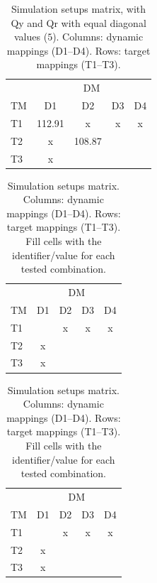 \documentclass[preprint,12pt,authoryear]{elsarticle}
\begin{document}
\begin{table}[h]
  \centering
  \caption{Simulation setups matrix, with Qy and Qr with equal diagonal values (\(5\)). Columns: dynamic mappings (D1--D4). Rows: target mappings (T1--T3).}
  \label{tab:setups-matrix}
  \begin{tabular}{lcccc}
      \toprule
      & \multicolumn{4}{c}{DM} \\
      \cmidrule(lr){2-5}
      TM & D1 & D2 & D3 & D4 \\
      \midrule
      T1 & 112.91 & x & x & x \\
      T2 & x & 108.87 &  &  \\
      T3 & x &  &  &  \\
      \bottomrule
  \end{tabular}
\end{table}

\begin{table}[h]
  \centering
  \caption{Simulation setups matrix. Columns: dynamic mappings (D1--D4). Rows: target mappings (T1--T3). Fill cells with the identifier/value for each tested combination.}
  \label{tab:setups-matrix}
  \begin{tabular}{lcccc}
      \toprule
      & \multicolumn{4}{c}{DM} \\
      \cmidrule(lr){2-5}
      TM & D1 & D2 & D3 & D4 \\
      \midrule
      T1 &  & x & x & x \\
      T2 & x &  &  &  \\
      T3 & x &  &  &  \\
      \bottomrule
  \end{tabular}
\end{table}

\begin{table}[h]
  \centering
  \caption{Simulation setups matrix. Columns: dynamic mappings (D1--D4). Rows: target mappings (T1--T3). Fill cells with the identifier/value for each tested combination.}
  \label{tab:setups-matrix}
  \begin{tabular}{lcccc}
      \toprule
      & \multicolumn{4}{c}{DM} \\
      \cmidrule(lr){2-5}
      TM & D1 & D2 & D3 & D4 \\
      \midrule
      T1 &  & x & x & x \\
      T2 & x &  &  &  \\
      T3 & x &  &  &  \\
      \bottomrule
  \end{tabular}
\end{table}
\end{document}

